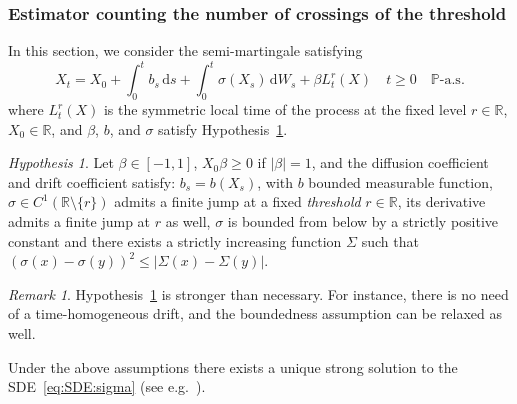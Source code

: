 \documentclass[12pt]{article}
\numberwithin{equation}{section}
\theoremstyle{definition}
\theoremstyle{remark}
\newtheorem{hypothesis}{Hypothesis}
\newtheorem{remark}{Remark}
\newcommand{\RR}{\mathbb{R}}
\newcommand{\vd}{\,\mathrm{d}}
\begin{document}
\subsubsection{Estimator counting the number of crossings of the threshold}


In this section, we consider the semi-martingale satisfying
\begin{equation} \label{eq:SDE:sigma}
	X_t = X_0 + \int_0^t b_s \vd s + \int_0^t  \sigma(X_s) \vd W_s + \beta L^r_t(X)  \quad t\geq 0 \quad \mathbb{P}\text{-a.s.}
\end{equation}
where $L^r_t(X)$ is the symmetric local time of the process at the fixed level $r\in \RR$, $X_0\in \RR$,
and $\beta$, $b$, and $\sigma$ satisfy Hypothesis~\ref{hyp:SDE:sigma}.
\begin{hypothesis} \label{hyp:SDE:sigma}
	Let $\beta \in [-1,1]$, $X_0 \beta \geq 0$ if $|\beta|=1$, 
and the diffusion coefficient and drift coefficient satisfy:
	$b_s=b(X_s)$, with $b$ bounded measurable function,
	$\sigma \in C^1(\RR\setminus\{r\})$ admits a finite jump at a fixed {\it threshold} $r\in \RR$, its derivative admits a finite jump at $r$ as well,
	$\sigma$ is bounded from below by a strictly positive constant and there exists a strictly increasing function $\Sigma$ such that $(\sigma(x)-\sigma(y))^2 \leq |\Sigma(x)-\Sigma(y)|$.
\end{hypothesis}

\begin{remark}
Hypothesis~\ref{hyp:SDE:sigma} is stronger than necessary. For instance, there is no need of a time-homogeneous drift, and the boundedness assumption 
can be relaxed as well.
\end{remark}

Under the above assumptions there exists a unique strong solution to the SDE~\eqref{eq:SDE:sigma} (see e.g.~\cite{BassChen05}).
%
%
\end{document}
